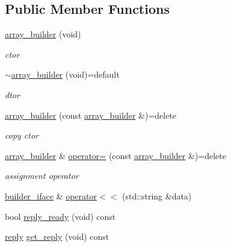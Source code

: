 \subsection*{Public Member Functions}
\begin{DoxyCompactItemize}
\item 
\hyperlink{classcpp__redis_1_1builders_1_1array__builder_a4beae33a547d3d7efc112659411a23a3}{array\+\_\+builder} (void)
\begin{DoxyCompactList}\small\item\em ctor \end{DoxyCompactList}\item 
\hyperlink{classcpp__redis_1_1builders_1_1array__builder_ae6a0cd0743b6b0a21f9c3d44fd31ac17}{$\sim$array\+\_\+builder} (void)=default
\begin{DoxyCompactList}\small\item\em dtor \end{DoxyCompactList}\item 
\hyperlink{classcpp__redis_1_1builders_1_1array__builder_aa0e5fe9a587b277a473d66b7e6db9548}{array\+\_\+builder} (const \hyperlink{classcpp__redis_1_1builders_1_1array__builder}{array\+\_\+builder} \&)=delete
\begin{DoxyCompactList}\small\item\em copy ctor \end{DoxyCompactList}\item 
\hyperlink{classcpp__redis_1_1builders_1_1array__builder}{array\+\_\+builder} \& \hyperlink{classcpp__redis_1_1builders_1_1array__builder_aaa1df845df7a007cf73f95f73e800c2c}{operator=} (const \hyperlink{classcpp__redis_1_1builders_1_1array__builder}{array\+\_\+builder} \&)=delete
\begin{DoxyCompactList}\small\item\em assignment operator \end{DoxyCompactList}\item 
\hyperlink{classcpp__redis_1_1builders_1_1builder__iface}{builder\+\_\+iface} \& \hyperlink{classcpp__redis_1_1builders_1_1array__builder_a043357d0ef70406adef4df78c8d5307f}{operator$<$$<$} (std\+::string \&data)
\item 
bool \hyperlink{classcpp__redis_1_1builders_1_1array__builder_a524f2cb943dde1246dea1b7057e6351e}{reply\+\_\+ready} (void) const
\item 
\hyperlink{classcpp__redis_1_1reply}{reply} \hyperlink{classcpp__redis_1_1builders_1_1array__builder_ac5c805ad87b357a9578c5a0d479109b3}{get\+\_\+reply} (void) const
\end{DoxyCompactItemize}
